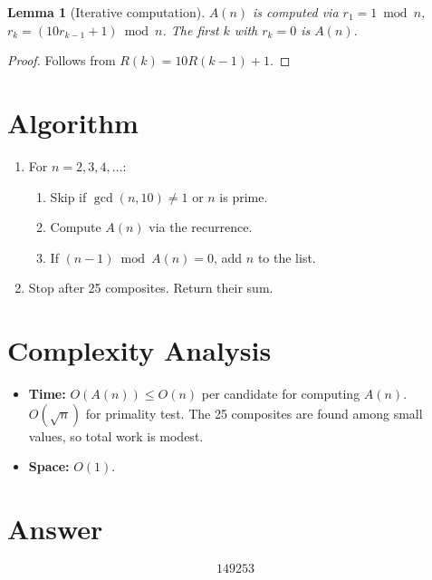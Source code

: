 \documentclass[11pt,a4paper]{article}
\newtheorem{lemma}[theorem]{Lemma}
\begin{document}
\begin{lemma}[Iterative computation]
$A(n)$ is computed via $r_1 = 1 \bmod n$, $r_k = (10r_{k-1} + 1) \bmod n$. The first $k$ with $r_k = 0$ is $A(n)$.
\end{lemma}

\begin{proof}
Follows from $R(k) = 10R(k-1) + 1$.
\end{proof}

\section{Algorithm}

\begin{enumerate}
\item For $n = 2, 3, 4, \ldots$:
\begin{enumerate}
\item Skip if $\gcd(n, 10) \ne 1$ or $n$ is prime.
\item Compute $A(n)$ via the recurrence.
\item If $(n-1) \bmod A(n) = 0$, add $n$ to the list.
\end{enumerate}
\item Stop after 25 composites. Return their sum.
\end{enumerate}

\section{Complexity Analysis}

\begin{itemize}
\item \textbf{Time:} $O(A(n)) \le O(n)$ per candidate for computing $A(n)$. $O(\sqrt{n})$ for primality test. The 25 composites are found among small values, so total work is modest.
\item \textbf{Space:} $O(1)$.
\end{itemize}

\section{Answer}

\[
\boxed{149253}
\]
\end{document}
